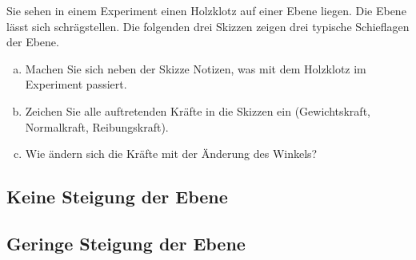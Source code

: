 \documentclass[12pt,a4paper,twoside]{article}
\begin{document}
\begin{aufgabe}
	Sie sehen in einem Experiment einen Holzklotz auf einer Ebene liegen. 
	Die Ebene lässt sich schrägstellen. Die folgenden drei Skizzen zeigen drei
	typische Schieflagen der Ebene.
	\begin{enumerate} [a)]
		\item Machen Sie sich neben der Skizze Notizen, was mit dem Holzklotz im Experiment passiert.
		\item Zeichen Sie alle auftretenden Kräfte in die Skizzen ein (Gewichtskraft, Normalkraft, Reibungskraft).
		\item Wie ändern sich die Kräfte mit der Änderung des Winkels?
	\end{enumerate}

\subsection*{Keine Steigung der Ebene}


\subsection*{Geringe Steigung der Ebene}
\end{aufgabe}
\end{document}
